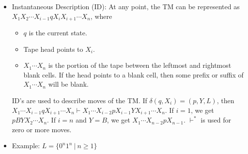 \documentclass{article}
\begin{document}
\begin{sloppypar}
\begin{itemize}
        \item Instantaneous Description (ID): At any point, the TM can be represented as $X_1X_2\cdots X_{i-1}qX_iX_{i+1}\cdots X_n$, where
        \begin{itemize}
            \item $q$ is the current state.
            \item Tape head points to $X_i$.
            \item $X_1\cdots X_n$ is the portion of the tape between the leftmost and rightmost blank cells. If the head points to a blank cell, then some prefix or suffix of $X_1\cdots X_n$ will be blank.
        \end{itemize}
        ID's are used to describe moves of the TM. If $\delta(q,X_i) = (p,Y,L)$, then $X_1\cdots X_{i-1}qX_{i+1}\cdots X_n \vdash X_1\cdots X_{i-2}pX_{i-1}YX_{i+1}\cdots X_n$. If $i=1$, we get $pBYX_2\cdots X_n$. If $i=n$ and $Y=B$, we get $X_1\cdots X_{n-2}pX_{n-1}$. $\vdash^*$ is used for zero or more moves.

        \item Example: $L = \{0^n1^n\ |\ n\ge1\}$
        
        \begin{minipage}{\linewidth}

            \centering

\end{minipage}
\end{itemize}
\end{sloppypar}
\end{document}
